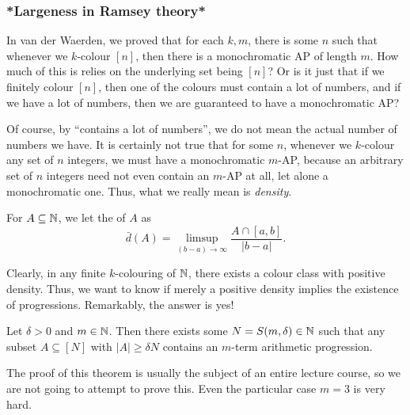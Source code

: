 \documentclass[a4paper]{article}
\begin{document}
\subsubsection*{*Largeness in Ramsey theory*}
In van der Waerden, we proved that for each $k, m$, there is some $n$ such that whenever we $k$-colour $[n]$, then there is a monochromatic AP of length $m$. How much of this is relies on the underlying set being $[n]$? Or is it just that if we finitely colour $[n]$, then one of the colours must contain a lot of numbers, and if we have a lot of numbers, then we are guaranteed to have a monochromatic AP?

Of course, by ``contains a lot of numbers'', we do not mean the actual number of numbers we have. It is certainly not true that for some $n$, whenever we $k$-colour any set of $n$ integers, we must have a monochromatic $m$-AP, because an arbitrary set of $n$ integers need not even contain an $m$-AP at all, let alone a monochromatic one. Thus, what we really mean is \emph{density}.
%
%
%
%
%
\begin{defi}[Density]
 For $A \subseteq \mathbb{N}$, we let the  of $A$ as
 \[
   \bar{d}(A) = \limsup_{(b - a) \to \infty} \frac{A \cap [a, b]}{|b - a|}.
 \]
\end{defi}
Clearly, in any finite $k$-colouring of $\mathbb{N}$, there exists a colour class with positive density. Thus, we want to know if merely a positive density implies the existence of progressions. Remarkably, the answer is yes!

\begin{thm}
  Let $\delta > 0$ and $m \in \mathbb{N}$. Then there exists some $N = S(m, \delta) \in \mathbb{N}$ such that any subset $A \subseteq [N]$ with $|A| \geq \delta N$ contains an $m$-term arithmetic progression.
\end{thm}
The proof of this theorem is usually the subject of an entire lecture course, so we are not going to attempt to prove this. Even the particular case $m = 3$ is very hard.
\end{document}
